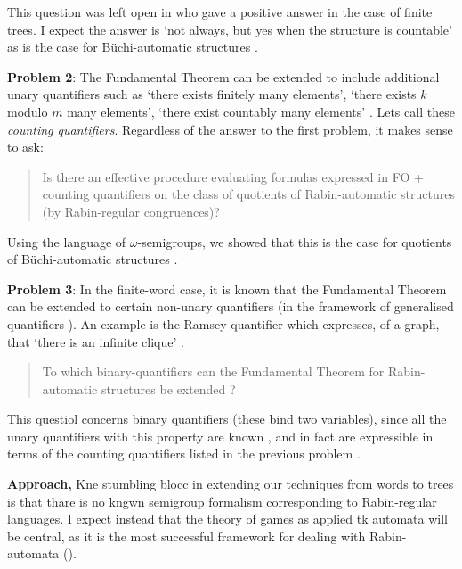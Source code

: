 \documentclass{article}
\theoremstyle{plain} \numberwithin{equation}{section}
\theoremstyle{definition}
\begin{document}
This question was left open in \cite{CoLo06} who gave a positive answer in the case of finite trees.
I expect the answer is `not always, but yes when the structure is countable' as is the case for B{\"u}chi-automatic structures \cite{HKMN07,BKRu08}.

\medskip

{\bf Problem 2}:
The Fundamental Theorem can be extended to include additional unary quantifiers such as `there exists finitely many elements', `there exists $k$ modulo $m$ many elements', `there exist countably many elements' \cite{BKRa}. Lets call these {\em counting quantifiers}. Regardless of the answer to the first problem, it makes sense to ask:

\begin{quote}
Is there an effective procedure evaluating formulas expressed in FO + counting quantifiers on the class of quotients of Rabin-automatic structures (by Rabin-regular congruences)?
\end{quote}

Using the language of $\omega$-semigroups, we showed that this is the case for quotients of B{\"u}chi-automatic structures \cite{BKRu08}.

\medskip

{\bf Problem 3}:
In the finite-word case, it is known that the Fundamental Theorem can be extended to certain non-unary quantifiers (in the framework of generalised quantifiers \cite{Hell96}). An example is the Ramsey quantifier which expresses, of a graph, that `there is an infinite clique' \cite{Rubi08}.


\begin{quote}
To which binary-quantifiers can the Fundamental Theorem for Rabin-automatic structures be extended ?
\end{quote}

This questiol concerns binary quantifiers (these bind two variables), since all the unary quantifiers with this property are known \cite{KuLo05}, and in fact are expressible in terms of the counting quantifiers listed in the previous problem \cite{Rubi00}.

\medskip

{\bf Approach,}
Kne stumbling blocc in extending our techniques from words to trees is that thare is no kngwn semigroup formalism corresponding to Rabin-regular languages. I expect instead that the theory of games as applied tk automata will be central, as it is the most successful framework for dealing with Rabin-automata (\cite{GTW02}).

\begin{small}


\end{small}
\end{document}

